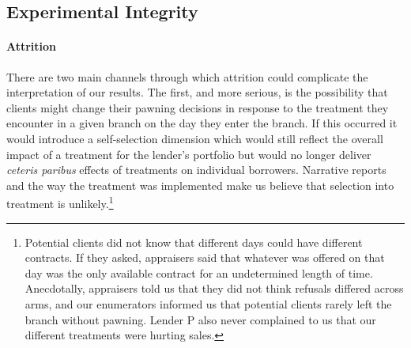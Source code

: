 \documentclass[12pt, a4paper]{article}
\begin{document}
\subsection{Experimental Integrity}
\label{sec:integrity}

\paragraph*{Attrition} There are two main channels through which attrition could complicate the interpretation of our results. The first, and more serious, is the possibility that clients might change their pawning decisions in response to the treatment they encounter in a given branch on the day they enter the branch.  If this occurred it would introduce a self-selection dimension which would still reflect the overall impact of a treatment for the lender's portfolio but would no longer deliver \textit{ceteris paribus} effects of treatments on individual borrowers.  Narrative reports and the way the treatment was implemented make us believe that selection into treatment is unlikely.\footnote{Potential clients did not know that different days could have different contracts. If they asked, appraisers said that whatever was offered on that day was the only available contract for an undetermined length of time. Anecdotally, appraisers told us that they did not think refusals differed across arms, and our enumerators informed us that potential clients rarely left the branch without pawning. Lender P also never complained to us that our different treatments were hurting sales.} 
\end{document}

